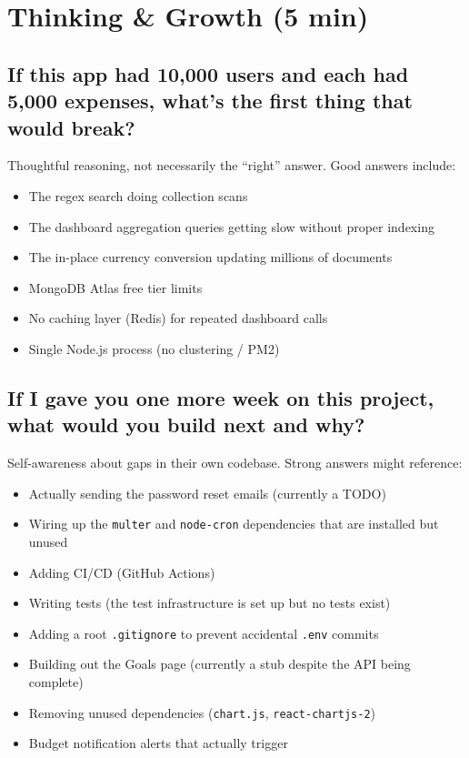 \documentclass[12pt, a4paper]{article}
\begin{document}
\newpage

\section{Thinking \& Growth \textnormal{\textcolor{slatelight}{(5 min)}}}

\subsection{If this app had 10,000 users and each had 5,000 expenses, what's the first thing that would break?}

\begin{listenfor}
Thoughtful reasoning, not necessarily the ``right'' answer. Good answers include:
\begin{itemize}[nosep]
  \item The regex search doing collection scans
  \item The dashboard aggregation queries getting slow without proper indexing
  \item The in-place currency conversion updating millions of documents
  \item MongoDB Atlas free tier limits
  \item No caching layer (Redis) for repeated dashboard calls
  \item Single Node.js process (no clustering / PM2)
\end{itemize}
\end{listenfor}

\subsection{If I gave you one more week on this project, what would you build next and why?}

\begin{listenfor}
Self-awareness about gaps in their own codebase. Strong answers might reference:
\begin{itemize}[nosep]
  \item Actually sending the password reset emails (currently a TODO)
  \item Wiring up the \texttt{multer} and \texttt{node-cron} dependencies that are installed but unused
  \item Adding CI/CD (GitHub Actions)
  \item Writing tests (the test infrastructure is set up but no tests exist)
  \item Adding a root \texttt{.gitignore} to prevent accidental \texttt{.env} commits
  \item Building out the Goals page (currently a stub despite the API being complete)
  \item Removing unused dependencies (\texttt{chart.js}, \texttt{react-chartjs-2})
  \item Budget notification alerts that actually trigger
\end{itemize}
\end{listenfor}
\end{document}

